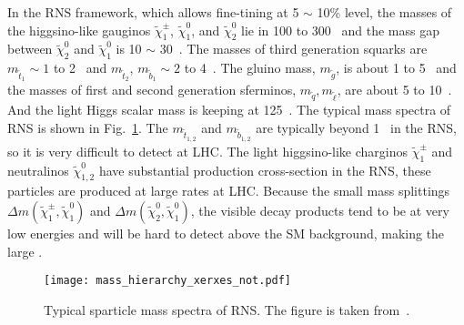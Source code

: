%
In the RNS framework, which allows fine-tining at 5 $\sim$ 10\% level, the masses of the higgsino-like gauginos $\widetilde{\chi}^{\pm}_{1}$, $\widetilde{\chi}^{0}_{1}$, and $\widetilde{\chi}^{0}_{2}$ lie in 100 to 300~{\GeV} and the mass gap between $\widetilde{\chi}^{0}_{2}$ and $\widetilde{\chi}^{0}_{1}$ is 10 $\sim$ 30~{\GeV}.
The masses of third generation squarks are $m_{\widetilde{t}_{1}} \sim 1$ to 2~{\TeV} and $m_{\widetilde{t}_{2}}$, $m_{\widetilde{b}_{1}} \sim 2$ to 4~{\TeV}.
The gluino mass, $m_{\widetilde{g}}$, is about 1 to 5~{\TeV} and the masses of first and second generation sferminos, $m_{\widetilde{q}}, m_{\widetilde{\ell}}$, are about 5 to 10~{\TeV}.
And the light Higgs scalar mass is keeping at 125~{\GeV}.
The typical mass spectra of RNS is shown in Fig.~\ref{fig:susy_RNS_mass_spectra}.
The $m_{\widetilde{t}_{1,2}}$ and $m_{\widetilde{b}_{1,2}}$ are typically beyond 1~{\TeV} in the RNS, so it is very difficult to detect at LHC.  
The light higgsino-like charginos $\widetilde{\chi}^{\pm}_{1}$ and neutralinos $\widetilde{\chi}^{0}_{1,2}$ have substantial production cross-section in the RNS, these particles are produced at large rates at LHC.
Because the small mass splittings $\Delta m(\widetilde{\chi}^{\pm}_{1}, \widetilde{\chi}^{0}_{1})$ and $\Delta m(\widetilde{\chi}^{0}_{2}, \widetilde{\chi}^{0}_{1})$, the visible decay products tend to be at very low energies and will be hard to detect above the SM background, making the large \met.


\begin{figure}[htb]
    \begin{center}
        \texttt{[image: mass\_hierarchy\_xerxes\_not.pdf]}
        \caption{Typical sparticle mass spectra of RNS.
        The figure is taken from~\cite{Baer:2013gva}.}
        \label{fig:susy_RNS_mass_spectra}
    \end{center}
\end{figure}


